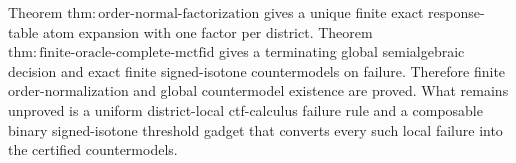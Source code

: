 Theorem \(\mathrm{thm:order\text{-}normal\text{-}factorization}\) gives a unique finite exact response-table atom expansion with one factor per district.  Theorem \(\mathrm{thm:finite\text{-}oracle\text{-}complete\text{-}mctfid}\) gives a terminating global semialgebraic decision and exact finite signed-isotone countermodels on failure.  Therefore finite order-normalization and global countermodel existence are proved.  What remains unproved is a uniform district-local ctf-calculus failure rule and a composable binary signed-isotone threshold gadget that converts every such local failure into the certified countermodels.